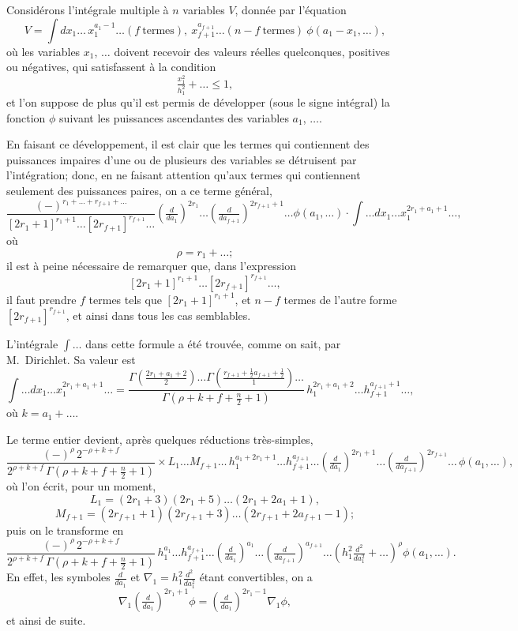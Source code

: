 \documentclass[12pt,a4paper]{article}
\begin{document}
Consid\'erons l'int\'egrale multiple \`a $n$ variables $V$, donn\'ee par l'\'equation
\[
V = \int dx_1 \ldots\, x_1^{a_1 - 1}\ldots (f\ \text{termes}),\ x_{f+1}^{a_{f+1}}\ldots (n - f\ \text{termes})\ \phi(a_1 - x_1, \ldots),
\]
o\`u les variables $x_1$, $\ldots$ doivent recevoir des valeurs r\'eelles quelconques, positives ou n\'egatives, qui satisfassent \`a la condition
\[
\tfrac{x_1^2}{h_1^2} + \ldots \leq 1,
\]
et l'on suppose de plus qu'il est permis de d\'evelopper (sous le signe int\'egral) la fonction $\phi$ suivant les puissances ascendantes des variables $a_1$, $\ldots$.

En faisant ce d\'eveloppement, il est clair que les termes qui contiennent des puissances impaires d'une ou de plusieurs des variables se d\'etruisent par l'int\'egration; donc, en ne faisant attention qu'aux termes qui contiennent seulement des puissances paires, on a ce terme g\'en\'eral,
\[
\frac{(-)^{r_1 + \ldots + r_{f+1} + \ldots}}{[2r_1 + 1]^{r_1 + 1}\ldots [2r_{f+1}]^{r_{f+1}}\ldots}\left(\tfrac{d}{da_1}\right)^{2r_1}\ldots\left(\tfrac{d}{da_{f+1}}\right)^{2r_{f+1}+1}\ldots \phi(a_1, \ldots) \cdot \int\ldots dx_1\ldots x_1^{2r_1 + a_1 + 1}\ldots,
\]
o\`u
\[
\rho = r_1 + \ldots;
\]
il est \`a peine n\'ecessaire de remarquer que, dans l'expression
\[
[2r_1 + 1]^{r_1 + 1}\ldots [2r_{f+1}]^{r_{f+1}}\ldots,
\]
il faut prendre $f$ termes tels que $[2r_1 + 1]^{r_1 + 1}$, et $n - f$ termes de l'autre forme $[2r_{f+1}]^{r_{f+1}}$, et ainsi dans tous les cas semblables.

L'int\'egrale $\int\ldots$ dans cette formule a \'et\'e trouv\'ee, comme on sait, par M.~Dirichlet. Sa valeur est
\[
\int\ldots dx_1\ldots x_1^{2r_1 + a_1 + 1}\ldots = \frac{\Gamma(\tfrac{2r_1 + a_1 + 2}{2})\ldots\Gamma(\tfrac{r_{f+1} + \tfrac12 a_{f+1} + \tfrac12}{1})\ldots}{\Gamma(\rho + k + f + \tfrac{n}{2} + 1)}\,h_1^{2r_1 + a_1 + 2}\ldots h_{f+1}^{a_{f+1}+1}\ldots,
\]
o\`u $k = a_1 + \ldots$.

\newpage
\setcounter{page}{197}

Le terme entier devient, apr\`es quelques r\'eductions tr\`es-simples,
\[
\frac{(-)^{\rho}\,2^{-\rho + k + f}}{2^{\rho + k + f}\,\Gamma(\rho + k + f + \tfrac{n}{2} + 1)}\times L_1\ldots M_{f+1}\ldots\, h_1^{a_1+2r_1+1}\ldots h_{f+1}^{a_{f+1}}\ldots\left(\tfrac{d}{da_1}\right)^{2r_1+1}\ldots\left(\tfrac{d}{da_{f+1}}\right)^{2r_{f+1}}\ldots\, \phi(a_1, \ldots),
\]
o\`u l'on \'ecrit, pour un moment,
\[
L_1 = (2r_1 + 3)(2r_1 + 5)\ldots(2r_1 + 2a_1 + 1),
\]
\[
M_{f+1} = (2r_{f+1} + 1)(2r_{f+1} + 3)\ldots(2r_{f+1} + 2a_{f+1} - 1);
\]
puis on le transforme en
\[
\frac{(-)^{\rho}\,2^{-\rho + k + f}}{2^{\rho + k + f}\,\Gamma(\rho + k + f + \tfrac{n}{2} + 1)}\,h_1^{a_1}\ldots h_{f+1}^{a_{f+1}}\ldots\left(\tfrac{d}{da_1}\right)^{a_1}\ldots\left(\tfrac{d}{da_{f+1}}\right)^{a_{f+1}}\ldots\left(h_1^2\tfrac{d^2}{da_1^2}+\ldots\right)^{\rho}\phi(a_1,\ldots).
\]
En effet, les symboles $\tfrac{d}{da_1}$ et $\nabla_1 = h_1^2\tfrac{d^2}{da_1^2}$ \'etant convertibles, on a
\[
\nabla_1\left(\tfrac{d}{da_1}\right)^{2r_1 + 1}\phi = \left(\tfrac{d}{da_1}\right)^{2r_1 - 1}\nabla_1\phi,
\]
et ainsi de suite.
\end{document}
